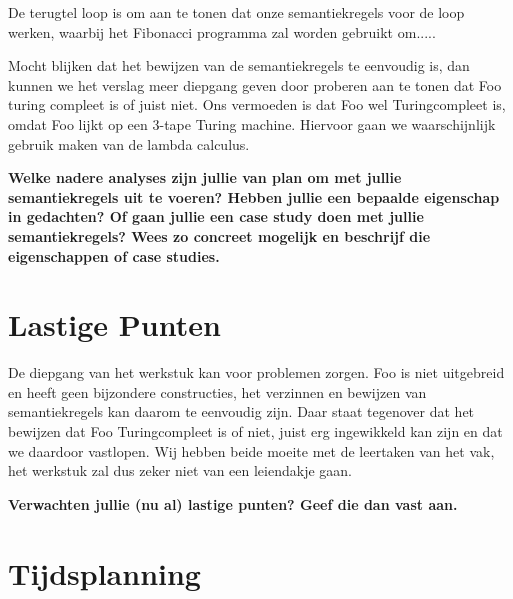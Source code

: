 \documentclass[11pt]{article}
\begin{document}
De terugtel loop is om aan te tonen dat onze semantiekregels voor de loop werken, waarbij het Fibonacci programma zal worden gebruikt om.....

Mocht blijken dat het bewijzen van de semantiekregels te eenvoudig is, dan kunnen we het verslag meer diepgang geven door proberen aan te tonen dat Foo turing compleet is of juist niet. Ons vermoeden is dat Foo wel Turingcompleet is, omdat Foo lijkt op een 3-tape Turing machine. Hiervoor gaan we waarschijnlijk gebruik maken van de lambda calculus.

{\bf
Welke nadere analyses zijn jullie van plan om met jullie semantiekregels uit te voeren? Hebben jullie een bepaalde eigenschap in gedachten? Of gaan jullie een case study doen met jullie semantiekregels? Wees zo concreet mogelijk en beschrijf die eigenschappen of case studies.
}

\section{Lastige Punten}

De diepgang van het werkstuk kan voor problemen zorgen. Foo is niet uitgebreid en heeft geen bijzondere constructies, het verzinnen en bewijzen van semantiekregels kan daarom te eenvoudig zijn. Daar staat tegenover dat het bewijzen dat Foo Turingcompleet is of niet, juist erg ingewikkeld kan zijn en dat we daardoor vastlopen.
\newline
Wij hebben beide moeite met de leertaken van het vak, het werkstuk zal dus zeker niet van een leiendakje gaan.

{\bf
Verwachten jullie (nu al) lastige punten? Geef die dan vast aan.
}
\section{Tijdsplanning}
\end{document}
